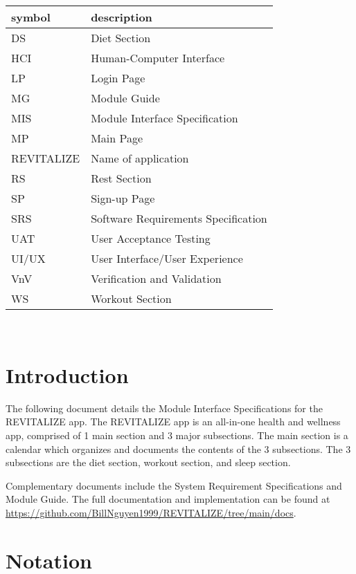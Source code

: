 \documentclass[12pt, titlepage]{article}
\begin{document}
\renewcommand{\arraystretch}{1.2}
\begin{tabular}{l l} 
	\toprule		
	\textbf{symbol} & \textbf{description}\\
	\midrule 
	DS & Diet Section\\
	HCI & Human-Computer Interface\\
	LP & Login Page\\
	MG & Module Guide\\
	MIS & Module Interface Specification\\
	MP & Main Page\\
	REVITALIZE & Name of application\\
	RS & Rest Section\\
	SP & Sign-up Page\\ 
	SRS & Software Requirements Specification\\
	UAT & User Acceptance Testing\\
	UI/UX & User Interface/User Experience\\
	VnV & Verification and Validation\\
	WS & Workout Section\\
	\bottomrule
\end{tabular}\\

\newpage

\tableofcontents

\newpage


\section{Introduction}

The following document details the Module Interface Specifications for
the REVITALIZE app. The REVITALIZE app is an all-in-one health and wellness app, comprised of 1 main 
section and 3 major subsections. The main section is a calendar which organizes and documents the contents of the 3 subsections. 
The 3 subsections are the diet section, workout section, and sleep section.

Complementary documents include the System Requirement Specifications
and Module Guide.  The full documentation and implementation can be
found at \url{https://github.com/BillNguyen1999/REVITALIZE/tree/main/docs}.

\section{Notation}
\end{document}
